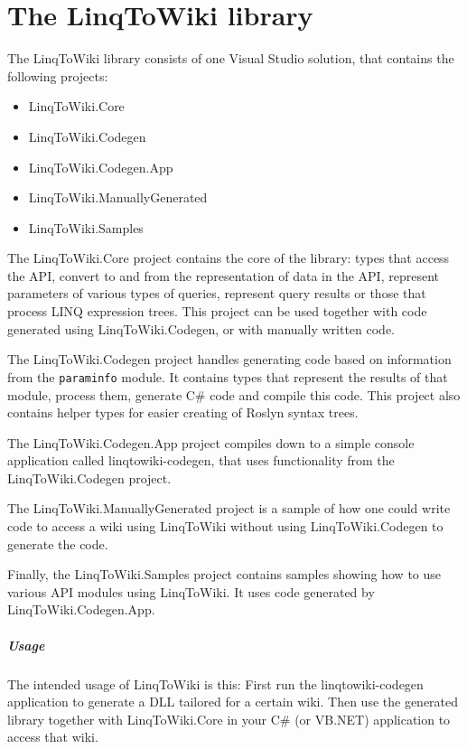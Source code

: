 \chapter{The LinqToWiki library}
\label{ltw}

The LinqToWiki library consists of one Visual Studio solution, that contains the following projects:

\begin{itemize}
\item LinqToWiki.Core
\item LinqToWiki.Codegen
\item LinqToWiki.Codegen.App
\item LinqToWiki.ManuallyGenerated
\item LinqToWiki.Samples
\end{itemize}

The LinqToWiki.Core project contains the core of the library:
types that access the \ac{API}, convert to and from the representation of data in the \ac{API},
represent parameters of various types of queries, represent query results
or those that process \ac{LINQ} expression trees.
This project can be used together with code generated using LinqToWiki.Codegen,
or with manually written code.

The LinqToWiki.Codegen project handles generating code based on information from the \texttt{paraminfo} module.
It contains types that represent the results of that module, process them, generate C\# code and compile this code.
This project also contains helper types for easier creating of Roslyn syntax trees.

The LinqToWiki.Codegen.App project compiles down to a simple console application called linqtowiki-codegen,
that uses functionality from the LinqToWiki.\allowbreak{}Codegen project.

The LinqToWiki.ManuallyGenerated project is a sample of how one could write code to access a wiki using LinqToWiki without using LinqToWiki.Codegen to generate the code.

Finally, the LinqToWiki.Samples project contains samples showing how to use various API modules using LinqToWiki.
It uses code generated by LinqToWiki.\allowbreak{}Codegen.\allowbreak{}App.

\paragraph{Usage}

The intended usage of LinqToWiki is this:
First run the linqtowiki-codegen application to generate a \ac{DLL} tailored for a certain wiki.
Then use the generated library together with LinqToWiki.Core in your C\# (or \ac{VB.NET}) application to access that wiki.

